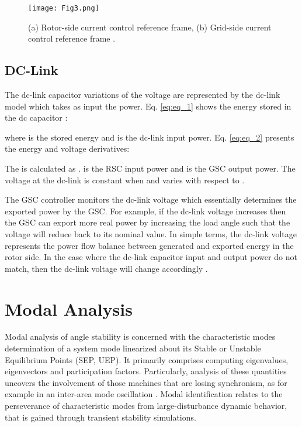 \documentclass[conference,11pt]{IEEEtran}
\newcommand{\ignore}[2]{\hspace{0in}#2}
\begin{document}
\begin{figure}[t]
  \centering
  \texttt{[image: Fig3.png]}
  \caption{(a) Rotor-side current control reference frame,  (b) Grid-side current control reference frame \cite{ref10}.}
  \label{f:fig3_label}
\end{figure} 

\subsection{DC-Link}

The dc-link capacitor variations of the voltage are represented by the dc-link model which takes as input the power. Eq. \ref{eq:eq_1} shows the energy stored in the dc capacitor \cite{ref10}:



{\setlength{\parindent}{0cm}
where  is the stored energy and  is the dc-link input power. Eq. \ref{eq:eq_2}} presents the energy and voltage derivatives:




{\setlength{\parindent}{0cm}
The  is calculated as .  is the RSC input power and  is the GSC output power. The voltage at the dc-link is constant when  and varies with respect to .}


The GSC controller monitors the dc-link voltage which essentially determines the exported power by the GSC. For example, if the dc-link voltage increases then the GSC can export more real power by increasing the load angle such that the voltage will reduce back to its nominal value. In simple terms, the dc-link voltage represents the power flow balance between generated and exported energy in the rotor side. In the case where the dc-link capacitor input and output power do not match, then the dc-link voltage will change accordingly \cite{ref14}.

\section{Modal Analysis}\label{s:modal_analysis}
Modal analysis of angle stability is concerned with the characteristic modes determination of a system mode linearized about its  Stable or Unstable Equilibrium Points (SEP, UEP). It primarily comprises computing eigenvalues, eigenvectors and participation factors. Particularly, analysis of these quantities uncovers the involvement of those machines that are losing synchronism, as for example in an inter-area mode oscillation \cite{ref16}. \ignore {While post-disturbance SEPs are generally easy to determine, computation of UEPs has long been considered as a problematic task \cite{ref17} \ignore{ref18}.} Modal identification \ignore{, on the other hand,} relates to the perseverance of characteristic modes from large-disturbance dynamic behavior, that is gained through transient stability simulations.  
\end{document}

